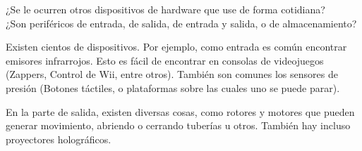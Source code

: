 \begin{exercise}
¿Se le ocurren otros dispositivos de hardware que use de forma cotidiana?\\
¿Son periféricos de entrada, de salida, de entrada y salida, o de
almacenamiento?
\end{exercise}

Existen cientos de dispositivos. Por ejemplo, como entrada es común encontrar
emisores infrarrojos. Esto es fácil de encontrar en consolas de videojuegos
(Zappers, Control de Wii, entre otros). También son comunes los sensores de
presión (Botones táctiles, o plataformas sobre las cuales uno se puede parar).

En la parte de salida, existen diversas cosas, como rotores y motores que pueden
generar movimiento, abriendo o cerrando tuberías u otros. También hay incluso
proyectores holográficos.

